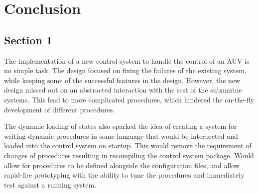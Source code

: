 
\chapter{Conclusion} %

\label{Chapter5} %


\section{Section 1}
The implementation of a new control system to handle the control of an AUV is no simple task. The design focused on fixing the failures of the existing system, while keeping some of the successful features in the design. However, the new design missed out on an abstracted interaction with the rest of the submarine systems. This lead to more complicated procedures, which hindered the on-the-fly development of different procedures.

The dynamic loading of states also sparked the idea of creating a system for writing dynamic procedures in some language that would be interpreted and loaded into the control system on startup. This would remove the requirement of changes of procedures resulting in recompiling the control system package. Would allow for procedures to be defined alongside the configuration files, and allow rapid-fire prototyping with the ability to tune the procedures and immediately test against a running system.